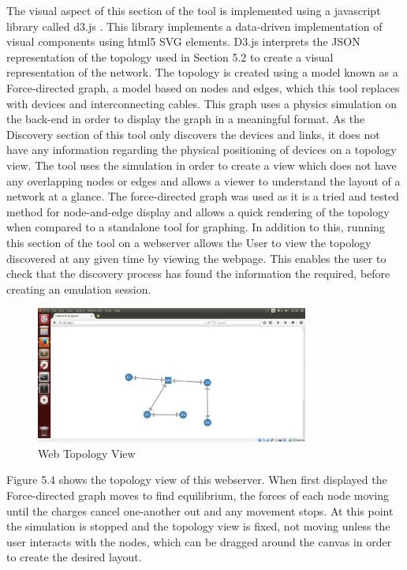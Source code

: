 \documentclass[11pt]{report}
\begin{document}
The visual aspect of this section of the tool is implemented using a javascript library called d3.js \citep{d3}. This library implements a data-driven implementation of visual components using html5 SVG elements. D3.js interprets the JSON representation of the topology used in Section 5.2 to create a visual representation of the network. The topology is created using a model known as a Force-directed graph, a model based on nodes and edges, which this tool replaces with devices and interconnecting cables. This graph uses a physics simulation on the back-end in order to display the graph in a meaningful format. As the Discovery section of this tool only discovers the devices and links, it does not have any information regarding the physical positioning of devices on a topology view. The tool uses the simulation in order to create a view which does not have any overlapping nodes or edges and allows a viewer to understand the layout of a network at a glance. The force-directed graph was used as it is a tried and tested method for node-and-edge display and allows a quick rendering of the topology when compared to a standalone tool for graphing. In addition to this, running this section of the tool on a webserver allows the User to view the topology discovered at any given time by viewing the webpage. This enables the user to check that the discovery process has found the information the required, before creating an emulation session.

\begin{figure}[h!]
	\caption{Web Topology View}
	\centering
	\includegraphics[width=0.8\textwidth]{topologyWeb.png}
\end{figure}

Figure 5.4 shows the topology view of this webserver. When first displayed the Force-directed graph moves to find equilibrium, the forces of each node moving until the charges cancel one-another out and any movement stops. At this point the simulation is stopped and the topology view is fixed, not moving unless the user interacts with the nodes, which can be dragged around the canvas in order to create the desired layout.
\end{document}

